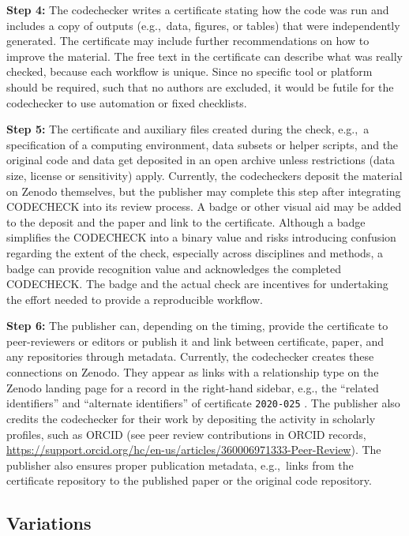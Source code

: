\documentclass[12pt]{article}
\begin{document}
\textbf{Step 4:} The codechecker writes a certificate stating how the
code was run and includes a copy of outputs (e.g.,~data, figures, or
tables) that were independently generated.  The certificate may
include further recommendations on how to improve the material.  The
free text in the certificate can describe what was really checked,
because each workflow is unique.  Since no specific tool or platform
should be required, such that no authors are excluded, it would be
futile for the codechecker to use automation or fixed checklists.

\textbf{Step 5:} The certificate and auxiliary files created during
the check, e.g.,~a specification of a computing environment, data
subsets or helper scripts, and the original code and data get
deposited in an open archive unless restrictions (data size, license
or sensitivity) apply.  Currently, the codecheckers deposit the
material on Zenodo themselves, but the publisher may complete this
step after integrating CODECHECK into its review process.  A badge or
other visual aid may be added to the deposit and the paper and link to
the certificate.  Although a badge simplifies the CODECHECK into a
binary value and risks introducing confusion regarding the extent of
the check, especially across disciplines and methods, a badge can
provide recognition value and acknowledges the completed CODECHECK.
The badge and the actual check are incentives for undertaking the
effort needed to provide a reproducible workflow.

\textbf{Step 6:} The publisher can, depending on the timing, provide
the certificate to peer-reviewers or editors or publish it and link
between certificate, paper, and any repositories through
metadata. Currently, the codechecker creates these connections on
Zenodo. They appear as links with a relationship type on the Zenodo
landing page for a record in the right-hand sidebar, e.g., the
``related identifiers'' and ``alternate identifiers'' of certificate
\texttt{2020-025} \cite{cert-2020-025}.  The publisher also credits
the codechecker for their work by depositing the activity in scholarly
profiles, such as ORCID (see peer review contributions in ORCID
records,
\url{https://support.orcid.org/hc/en-us/articles/360006971333-Peer-Review}).
The publisher also ensures proper publication metadata, e.g.,~links
from the certificate repository to the published paper or the original
code repository.

\subsection*{Variations}\label{variations}
\end{document}
